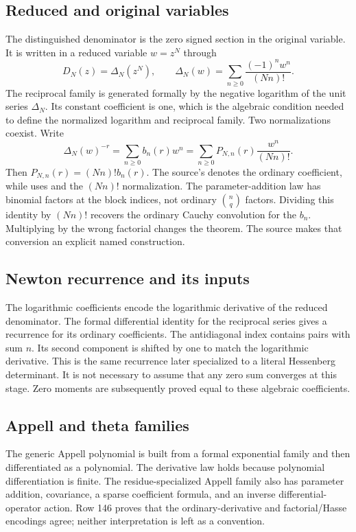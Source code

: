 \subsection{Reduced and original variables}
The distinguished denominator is the zero signed section in the original variable. It is written in a reduced variable $w=z^N$ through
\[
 D_N(z)=\Delta_N(z^N),\qquad
 \Delta_N(w)=\sum_{n\geq0}\frac{(-1)^nw^n}{(Nn)!}.
\]
The reciprocal family is generated formally by the negative logarithm of the unit series $\Delta_N$. Its constant coefficient is one, which is the algebraic condition needed to define the normalized logarithm and reciprocal family.
Two normalizations coexist. Write
\[
 \Delta_N(w)^{-r}=\sum_{n\geq0}b_n(r)w^n
 =\sum_{n\geq0}P_{N,n}(r)\frac{w^n}{(Nn)!}.
\]
Then $P_{N,n}(r)=(Nn)!b_n(r)$. The source's  denotes the ordinary coefficient, while  uses  and the $(Nn)!$ normalization.
The parameter-addition law has binomial factors at the block indices, not ordinary $\binom nq$ factors.
Dividing this identity by $(Nn)!$ recovers the ordinary Cauchy convolution for the $b_n$. Multiplying by the wrong factorial changes the theorem. The source makes that conversion an explicit named construction.

\subsection{Newton recurrence and its inputs}
The logarithmic coefficients  encode the logarithmic derivative of the reduced denominator. The formal differential identity for the reciprocal series gives a recurrence for its ordinary coefficients.
The antidiagonal index contains pairs with sum $n$. Its second component is shifted by one to match the logarithmic derivative. This is the same recurrence later specialized to a literal Hessenberg determinant. It is not necessary to assume that any zero sum converges at this stage. Zero moments are subsequently proved equal to these algebraic coefficients.

\subsection{Appell and theta families}
The generic Appell polynomial is built from a formal exponential family and then differentiated as a polynomial.
The derivative law holds because polynomial differentiation is finite. The residue-specialized Appell family also has parameter addition, covariance, a sparse coefficient formula, and an inverse differential-operator action. Row 146 proves that the ordinary-derivative and factorial/Hasse encodings agree; neither interpretation is left as a convention.


